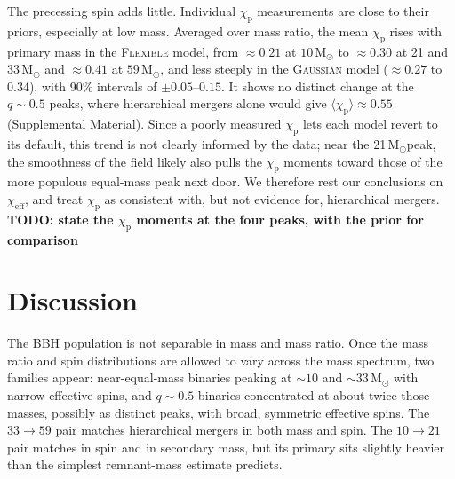 \documentclass[%
 reprint,
 amsmath,amssymb,
 aps,
 prl,
 nofootinbib,nobibnotes,
 floatfix,
]{revtex4-2}
\newcommand{\Msun}{\ensuremath{\mathrm{M}_{\odot}}}
\newcommand{\chieff}{\ensuremath{\chi_{\mathrm{eff}}}}
\newcommand{\chip}{\ensuremath{\chi_{\mathrm{p}}}}
\newcommand{\todo}[1]{{\color{Blue}\bf TODO: #1}}
\newcommand{\flexiblespins}{\textsc{Flexible}\xspace}
\newcommand{\gaussianspins}{\textsc{Gaussian}\xspace}
\newcommand{\featTen}{10\xspace}
\newcommand{\featTwenty}{21\xspace}
\newcommand{\featThirtyFive}{33\xspace}
\newcommand{\featSixty}{59\xspace}
\begin{document}
The precessing spin adds little. Individual $\chip$ measurements are close to their priors, especially at low mass. Averaged over mass ratio, the mean $\chip$ rises with primary mass in the \flexiblespins model, from $\approx 0.21$ at $\featTen\,\Msun$ to $\approx 0.30$ at \featTwenty and $\featThirtyFive\,\Msun$ and $\approx 0.41$ at $\featSixty\,\Msun$, and less steeply in the \gaussianspins model ($\approx 0.27$ to $0.34$), with 90\% intervals of $\pm 0.05$--$0.15$. It shows no distinct change at the $q \sim 0.5$ peaks, where hierarchical mergers alone would give $\langle \chip \rangle \approx 0.55$ (Supplemental Material). Since a poorly measured $\chip$ lets each model revert to its default, this trend is not clearly informed by the data; near the \featTwenty\,\Msun peak, the smoothness of the field likely also pulls the $\chip$ moments toward those of the more populous equal-mass peak next door. We therefore rest our conclusions on $\chieff$, and treat $\chip$ as consistent with, but not evidence for, hierarchical mergers. \todo{state the $\chip$ moments at the four peaks, with the prior for comparison}

\section{Discussion}

The \ac{BBH} population is not separable in mass and mass ratio. Once the mass ratio and spin distributions are allowed to vary across the mass spectrum, two families appear: near-equal-mass binaries peaking at $\sim \featTen$ and $\sim \featThirtyFive\,\Msun$ with narrow effective spins, and $q \sim 0.5$ binaries concentrated at about twice those masses, possibly as distinct peaks, with broad, symmetric effective spins. The $\featThirtyFive \to \featSixty$ pair matches hierarchical mergers in both mass and spin. The $\featTen \to \featTwenty$ pair matches in spin and in secondary mass, but its primary sits slightly heavier than the simplest remnant-mass estimate predicts.
\end{document}
